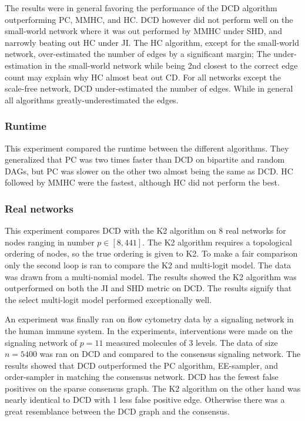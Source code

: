 \documentclass[twoside,11pt]{article}
\begin{document}
The results were in general favoring the performance of the DCD algorithm outperforming PC, MMHC, and HC. DCD however did not perform well on the small-world network where it was out performed by MMHC under SHD, and narrowly beating out HC under JI. The HC algorithm, except for the small-world network, over-estimated the number of edges by a significant margin; The under-estimation in the small-world network while being 2nd closest to the correct edge count may explain why HC almost beat out CD. For all networks except the scale-free network, DCD under-estimated the number of edges. While in general all algorithms greatly-underestimated the edges.

\subsubsection{Runtime}
This experiment compared the runtime between the different algorithms. They generalized that PC was two times faster than DCD on bipartite and random DAGs, but PC was slower on the other two almost being the same as DCD. HC followed by MMHC were the fastest, although HC did not perform the best.

\subsubsection{Real networks}
This experiment compares DCD with the K2 algorithm on 8 real networks for nodes ranging in number $p\in[8,441]$. The K2 algorithm requires a topological ordering of nodes, so the true ordering is given to K2. To make a fair comparison only the second loop is ran to compare the K2 and multi-logit model. The data was drawn from a multi-nomial model. The results showed the K2 algorithm was outperformed on both the JI and SHD metric on DCD. The results signify that the select multi-logit model performed exceptionally well.

An experiment was finally ran on flow cytometry data by \citeauthor{sachs2005} a signaling network in the human immune system. In the experiments, interventions were made on the signaling network of $p=11$ measured molecules of 3 levels. The data of size $n=5400$ was ran on DCD and compared to the consensus signaling network. The results showed that DCD outperformed the PC algorithm, EE-sampler, and order-sampler in matching the consensus network. DCD has the fewest false positives on the sparse consensus graph. The K2 algorithm on the other hand was nearly identical to DCD with 1 less false positive edge. Otherwise there was a great resemblance between the DCD graph and the consensus.
\end{document}
